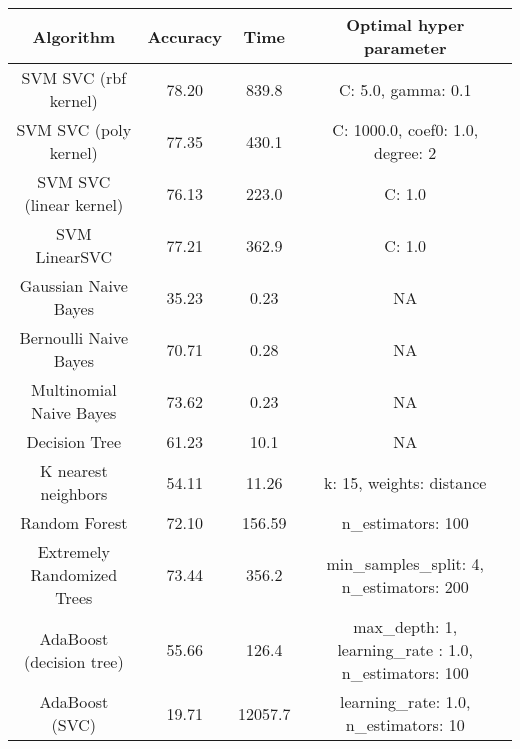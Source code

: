 \begin{center}
	\begin{tabular}{c|c|c|c}
    \hline
	     Algorithm   & Accuracy & Time & Optimal hyper parameter\\
         \hline
         SVM SVC (rbf kernel)   & 78.20  & 839.8 & C: 5.0, gamma: 0.1\\
         \hline
         SVM SVC (poly kernel)  & 77.35  & 430.1 & C: 1000.0, coef0: 1.0, degree: 2\\
         \hline
         SVM SVC (linear kernel)   &  76.13  & 223.0 & C: 1.0\\
         \hline
         SVM LinearSVC    &  77.21   &362.9  & C: 1.0\\
         \hline
         \hline
         Gaussian Naive Bayes & 35.23 & 0.23 & NA \\
         \hline
         Bernoulli Naive Bayes &   70.71    & 0.28  & NA \\
         \hline
         Multinomial Naive Bayes & 73.62 	& 0.23  & NA \\
         \hline
         \hline
         Decision Tree &  61.23 & 10.1 & NA \\
         \hline
         \hline
         K nearest neighbors & 54.11 & 11.26 & k: 15, weights:  distance\\
         \hline
         \hline
         Random Forest & 72.10 & 156.59 & n\_estimators: 100\\
         \hline
         Extremely Randomized Trees & 73.44 & 356.2 &
         min\_samples\_split: 4,
         n\_estimators: 200 \\
         \hline
         AdaBoost (decision tree) & 55.66 & 126.4 & max\_depth: 1, learning\_rate : 1.0, n\_estimators: 100\\
         \hline
         AdaBoost (SVC) & 19.71 & 12057.7 & learning\_rate: 1.0,
         n\_estimators: 10\\
         \hline
          \end{tabular}
\end{center}